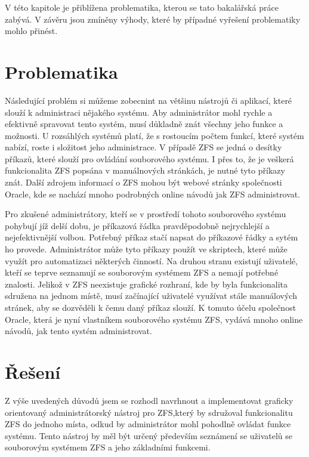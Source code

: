 V této kapitole je přiblížena problematika, kterou se tato bakalářská práce zabývá. V závěru jsou zmíněny výhody, které by případné vyřešení problematiky mohlo přinést.

\section{Problematika}
Následující problém si můžeme zobecnint na většinu nástrojů či aplikací, které slouží k administraci nějakého systému.
Aby administrátor mohl rychle a efektivně spravovat tento systém, musí důkladně znát všechny jeho funkce a možnosti. U rozsáhlých systémů platí, že s rostoucím počtem funkcí, které systém nabízí, roste i složitost jeho administrace. V případě ZFS se jedná o desítky příkazů, které slouží pro ovládání souborového systému. I přes to, že je veškerá funkcionalita ZFS popsána v manuálnových stránkách, je nutné tyto příkazy znát.
Další zdrojem informací o ZFS mohou být webové stránky společnosti Oracle, kde se nachází mnoho
podrobných online návodů jak ZFS administrovat.

Pro zkušené administrátory, kteří se v prostředí tohoto souborového systému pohybují jíž delší dobu, je příkazová řádka pravděpodobně nejrychlejší a nejefektivnější volbou. Potřebný příkaz stačí napsat do příkazové řádky a sytém ho provede. Administrátor může tyto příkazy použít ve skriptech, které může využít pro automatizaci některých činností. Na druhou stranu existují uživatelé, kteří se teprve seznamují se souborovým systémem ZFS a nemají potřebné znalosti. Jelikož v ZFS neexistuje grafické rozhraní, kde by byla funkcionalita sdružena na jednom místě, musí začínající uživatelé využívat stále manuálových stránek, aby se dozvěděli k čemu daný příkaz slouží. K tomuto účelu společnost Oracle, která je nyní vlastníkem souborového systému ZFS, vydává mnoho online návodů, jak tento systém administrovat.
\section{Řešení}
Z výše uvedených důvodů jsem se rozhodl navrhnout a implementovat graficky orientovaný administrátorský nástroj pro ZFS,který by sdružoval funkcionalitu ZFS do jednoho místa, odkud by administrátor mohl pohodlně ovládat funkce systému. Tento nástroj by měl být určený především seznámení se uživatelů se souborovým systémem ZFS a jeho základními funkcemi.

